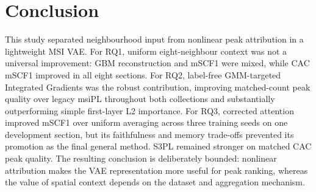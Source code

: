 \section{Conclusion}
\label{sec:conclusion}

This study separated neighbourhood input from nonlinear peak attribution in a
lightweight MSI VAE. For RQ1, uniform eight-neighbour context was not a
universal improvement: GBM reconstruction and mSCF1 were mixed, while CAC
mSCF1 improved in all eight sections. For RQ2, label-free GMM-targeted
Integrated Gradients was the robust contribution, improving matched-count peak
quality over legacy msiPL throughout both collections and substantially
outperforming simple first-layer L2 importance. For RQ3, corrected attention
improved mSCF1 over uniform averaging across three training seeds on one
development section, but its faithfulness and memory trade-offs prevented its
promotion as the final general method. S3PL remained stronger on matched CAC
peak quality. The resulting conclusion is deliberately bounded: nonlinear
attribution makes the VAE representation more useful for peak ranking, whereas
the value of spatial context depends on the dataset and aggregation mechanism.
